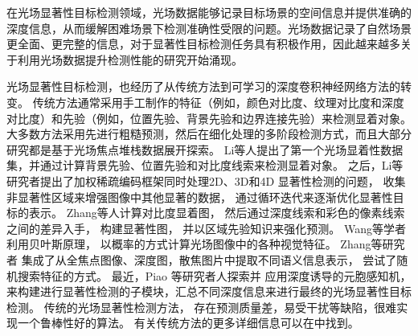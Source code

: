 



\label{chpt1:title:lf_methods}


在光场显著性目标检测领域，光场数据能够记录目标场景的空间信息并提供准确的深度信息，从而缓解困难场景下检测准确性受限的问题。光场数据记录了自然场景更全面、更完整的信息，对于显著性目标检测任务具有积极作用，因此越来越多关于利用光场数据提升检测性能的研究开始涌现。






光场显著性目标检测，也经历了从传统方法到可学习的深度卷积神经网络方法的转变。
传统方法通常采用手工制作的特征（例如，颜色对比度、纹理对比度和深度对比度）和先验（例如，位置先验、背景先验和边界连接先验）来检测显着对象。 
大多数方法采用先进行粗糙预测，然后在细化处理的多阶段检测方式，而且大部分研究都是基于光场焦点堆栈数据展开探索。
%
%
Li等人提出了第一个光场显着性数据集，并通过计算背景先验、位置先验和对比度线索来检测显着对象。
之后，Li等研究者提出了加权稀疏编码框架同时处理2D、3D和4D 显著性检测的问题，
收集非显著性区域来增强图像中其他显著的数据，
通过循环迭代来逐渐优化显著性目标的表示。
Zhang等人计算对比度显着图，
然后通过深度线索和彩色的像素线索之间的差异入手，
构建显著性图，
并以区域先验知识来强化预测。
Wang等学者利用贝叶斯原理，
以概率的方式计算光场图像中的各种视觉特征。
Zhang等研究者
集成了从全焦点图像、深度图，散焦图片中提取不同语义信息表示，
尝试了随机搜索特征的方式。
最近，Piao 等研究者人探索并
应用深度诱导的元胞感知机，
来构建进行显著性检测的子模块，汇总不同深度信息来进行最终的光场显著性目标检测。
传统的光场显著性检测方法，
存在预测质量差，易受干扰等缺陷，很难实现一个鲁棒性好的算法。
有关传统方法的更多详细信息可以在中找到。





